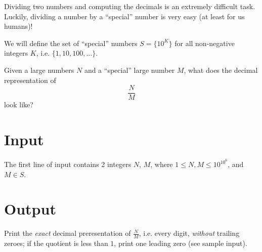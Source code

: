 


Dividing two numbers and computing the decimals is an extremely difficult task. Luckily, dividing a number by a ``special'' number is very easy (at least for us humans)!
 
We will define the set of ``special'' numbers $S=\{10^K\}$ for all non-negative integers $K$, i.e. $\{1,10,100,\ldots\}$.

Given a large numbers $N$ and a ``special'' large number $M$, what does the decimal representation of $$\frac{N}{M}$$ look like?

\section*{Input}

The first line of input contains 2 integers $N$, $M$, where $1\leq N, M\leq 10^{10^6}$, and $M\in S$.

\section*{Output}

Print the \emph{exact} decimal preresentation of $\frac{N}{M}$, i.e. every digit, \emph{without} trailing zeroes; if the quotient is less than $1$, print one leading zero (see sample input).
